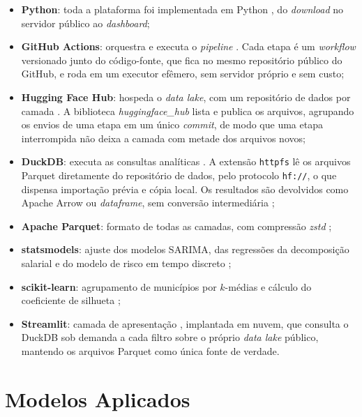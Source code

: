 \begin{itemize}
    \item \textbf{Python}: toda a plataforma foi implementada em Python \cite{Python2024}, do \textit{download} no servidor público ao \textit{dashboard};

    \item \textbf{GitHub Actions}: orquestra e executa o \textit{pipeline} \cite{GitHubActions2026}. Cada etapa é um \textit{workflow} versionado junto do código-fonte, que fica no mesmo repositório público do GitHub, e roda em um executor efêmero, sem servidor próprio e sem custo;

    \item \textbf{Hugging Face Hub}: hospeda o \textit{data lake}, com um repositório de dados por camada \cite{HuggingFaceDatasets2026}. A biblioteca \textit{huggingface\_hub} lista e publica os arquivos, agrupando os envios de uma etapa em um único \textit{commit}, de modo que uma etapa interrompida não deixa a camada com metade dos arquivos novos;

    \item \textbf{DuckDB}: executa as consultas analíticas \cite{DuckDB2024}. A extensão \texttt{httpfs} lê os arquivos Parquet diretamente do repositório de dados, pelo protocolo \texttt{hf://}, o que dispensa importação prévia e cópia local. Os resultados são devolvidos como Apache Arrow ou \textit{dataframe}, sem conversão intermediária \cite{PyArrow2024};

    \item \textbf{Apache Parquet}: formato de todas as camadas, com compressão \textit{zstd} \cite{ApacheParquet2024};

    \item \textbf{statsmodels}: ajuste dos modelos SARIMA, das regressões da decomposição salarial e do modelo de risco em tempo discreto \cite{Seabold2010};

    \item \textbf{scikit-learn}: agrupamento de municípios por $k$-médias e cálculo do coeficiente de silhueta \cite{Pedregosa2011};

    \item \textbf{Streamlit}: camada de apresentação \cite{Streamlit2024}, implantada em nuvem, que consulta o DuckDB sob demanda a cada filtro sobre o próprio \textit{data lake} público, mantendo os arquivos Parquet como única fonte de verdade.
\end{itemize}

\section{Modelos Aplicados}

